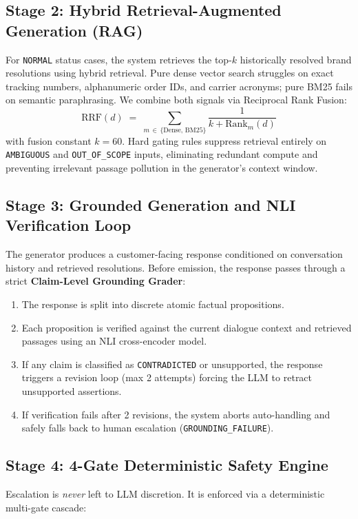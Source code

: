 \documentclass[10pt,twocolumn,a4paper]{article}
\begin{document}
\subsection{Stage 2: Hybrid Retrieval-Augmented Generation (RAG)}
For \texttt{NORMAL} status cases, the system retrieves the top-$k$
historically resolved brand resolutions using hybrid retrieval. Pure
dense vector search struggles on exact tracking numbers, alphanumeric
order IDs, and carrier acronyms; pure BM25 fails on semantic
paraphrasing. We combine both signals via Reciprocal Rank Fusion:
\begin{equation}
\text{RRF}(d) \;=\; \sum_{m\,\in\,\{\text{Dense},\,\text{BM25}\}}
  \frac{1}{k + \text{Rank}_m(d)}
\end{equation}
with fusion constant $k{=}60$. Hard gating rules suppress retrieval
entirely on \texttt{AMBIGUOUS} and \texttt{OUT\_OF\_SCOPE} inputs,
eliminating redundant compute and preventing irrelevant passage
pollution in the generator's context window.

\subsection{Stage 3: Grounded Generation and NLI Verification Loop}
The generator produces a customer-facing response conditioned on
conversation history and retrieved resolutions. Before emission,
the response passes through a strict \textbf{Claim-Level Grounding
Grader}:

\begin{enumerate}
  \item The response is split into discrete atomic factual propositions.
  \item Each proposition is verified against the current dialogue context
        and retrieved passages using an NLI cross-encoder model.
  \item If any claim is classified as \texttt{CONTRADICTED} or
        unsupported, the response triggers a revision loop (max 2
        attempts) forcing the LLM to retract unsupported assertions.
  \item If verification fails after 2 revisions, the system aborts
        auto-handling and safely falls back to human escalation
        (\texttt{GROUNDING\_FAILURE}).
\end{enumerate}

\subsection{Stage 4: 4-Gate Deterministic Safety Engine}
Escalation is \textit{never} left to LLM discretion. It is enforced
via a deterministic multi-gate cascade:
\end{document}
